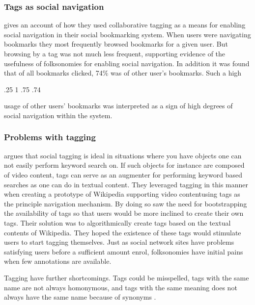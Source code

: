 \subsubsection{Tags as social navigation}

\citet{millen06} gives an account of how they used collaborative
tagging as a means for enabling social navigation in their
 social bookmarking system. When users
were navigating bookmarks they most frequently browsed bookmarks for a given
user. But browsing by a tag was not much less frequent, supporting evidence of
the usefulness of folksonomies for enabling social navigation. In addition
it was found that of all bookmarks clicked, 74\% was of other user's
bookmarks. Such a high
\begin{sparkline}{3}
  \sparkspike .25  1
  \sparkspike .75  .74
\end{sparkline}
usage of other users' bookmarks was interpreted as a sign of high degrees of
social navigation within the system.

\subsubsection{Problems with tagging}

\citet[]{fokker06} argues that social tagging is ideal in situations
where you have objects one can not easily perform keyword search on.
If such objects for instance are composed of video content, tags
can serve as an augmenter for performing keyword based searches as one can
do in textual content. They leveraged tagging in this manner when creating a
prototype of Wikipedia supporting video content\dash{}using tags as the
principle navigation mechanism. By doing so \citet[]{fokker06}
saw the need for bootstrapping the availability of tags so that users would be
more inclined to create their own tags. Their solution was to algorithmically
create tags based on the textual contents of Wikipedia.
They hoped the existence
of these tags would stimulate users to start tagging themselves. Just as
social network sites have problems satisfying users before a
sufficient amount enrol, folksonomies have initial pains when
few annotations are available.

Tagging have further shortcomings. Tags could be misspelled, tags with the
same name are not always  homonymous, and tags with the same meaning does not
always have the same name because of synonyms \citep[]{aurnhammer06}.

